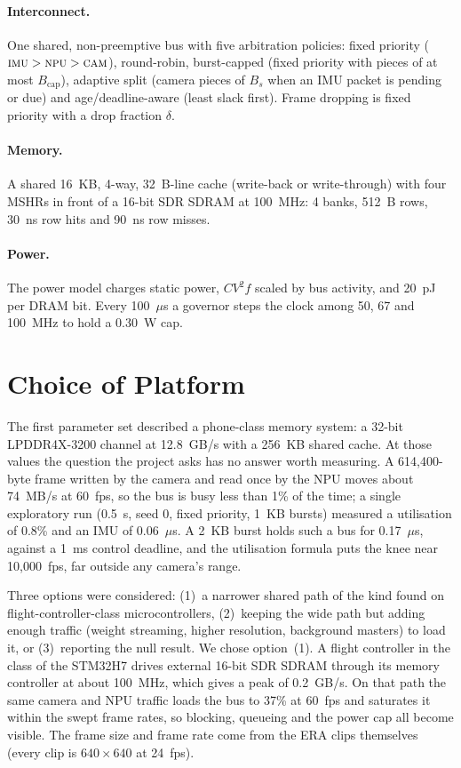 \documentclass[11pt,a4paper]{article}
\begin{document}
\paragraph{Interconnect.} One shared, non-preemptive bus with five arbitration policies: fixed priority ($\textsc{imu}>\textsc{npu}>\textsc{cam}$), round-robin, burst-capped (fixed priority with pieces of at most $B_{\mathrm{cap}}$), adaptive split (camera pieces of $B_s$ when an IMU packet is pending or due) and age/deadline-aware (least slack first). Frame dropping is fixed priority with a drop fraction $\delta$.
\paragraph{Memory.} A shared 16~KB, 4-way, 32~B-line cache (write-back or write-through) with four MSHRs in front of a 16-bit SDR SDRAM at 100~MHz: 4 banks, 512~B rows, 30~ns row hits and 90~ns row misses.
\paragraph{Power.} The power model charges static power, $CV^2f$ scaled by bus activity, and 20~pJ per DRAM bit. Every 100~$\mu$s a governor steps the clock among 50, 67 and 100~MHz to hold a 0.30~W cap.

\section{Choice of Platform}\label{sec:platform}
The first parameter set described a phone-class memory system: a 32-bit LPDDR4X-3200 channel at 12.8~GB/s with a 256~KB shared cache. At those values the question the project asks has no answer worth measuring. A 614{,}400-byte frame written by the camera and read once by the NPU moves about 74~MB/s at 60~fps, so the bus is busy less than 1\% of the time; a single exploratory run (0.5~s, seed 0, fixed priority, 1~KB bursts) measured a utilisation of 0.8\% and an IMU \pone{} of 0.06~$\mu$s. A 2~KB burst holds such a bus for 0.17~$\mu$s, against a 1~ms control deadline, and the utilisation formula puts the knee near 10{,}000~fps, far outside any camera's range.

Three options were considered: (1)~a narrower shared path of the kind found on flight-controller-class microcontrollers, (2)~keeping the wide path but adding enough traffic (weight streaming, higher resolution, background masters) to load it, or (3)~reporting the null result. We chose option~(1). A flight controller in the class of the STM32H7 drives external 16-bit SDR SDRAM through its memory controller at about 100~MHz, which gives a peak of 0.2~GB/s. On that path the same camera and NPU traffic loads the bus to 37\% at 60~fps and saturates it within the swept frame rates, so blocking, queueing and the power cap all become visible. The frame size and frame rate come from the ERA clips themselves (every clip is $640\times640$ at 24~fps).
\end{document}
